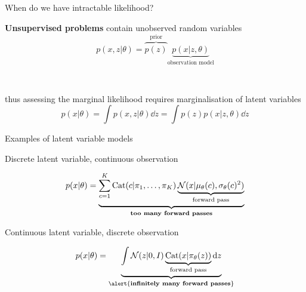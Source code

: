 \documentclass[14pt]{beamer}
\begin{document}
\begin{frame}{When do we have intractable likelihood?}

{\bf Unsupervised problems} contain unobserved random variables\\ 
\begin{equation*}
p(x, z|\theta) = \overbrace{p(z)}^{\text{prior}} \underbrace{p(x|z, \theta)}_{\text{observation model}}
\end{equation*}

~ \pause

thus assessing the marginal likelihood requires \alert{marginalisation of latent variables} 
\begin{equation*}
p(x|\theta) = \int p(x, z|\theta) \dd{z} = \int p(z)p(x|z, \theta) \dd{z} 
\end{equation*}

\end{frame}


\begin{frame}{Examples of latent variable models}



Discrete latent variable, continuous observation
	\begin{small}
	\begin{equation*}
	p(x|\theta) = \underbrace{\sum_{c=1}^K \operatorname{Cat}(c|\pi_1, \ldots, \pi_K) \underbrace{\mathcal N(x|\mu_\theta(c), \sigma_\theta(c)^2)}_{\text{forward pass}}}_{\text{{\bf too many forward passes}}}
	\end{equation*}
	\end{small} 

	\pause
	
Continuous latent variable, discrete observation
	\begin{small}
	\begin{equation*}
	p(x|\theta) = \underbrace{\int \mathcal N(z|0, I) \underbrace{\Cat(x|\pi_\theta(z))}_{\text{forward pass}} \mathrm{d}z }_{\text{\alert{{\bf infinitely many forward passes}}}}
	\end{equation*}
	\end{small}

\end{frame}
\end{document}

